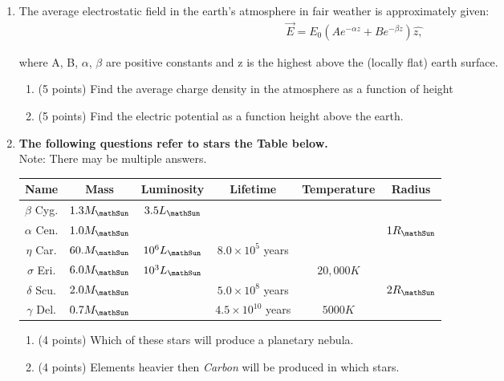 \documentclass[12pt]{article}
\begin{document}
\begin{enumerate}
\color{black}
\item The average electrostatic field in the earth's atmosphere in fair weather is approximately given:
\begin{align}
    \vec{E} = E_0 (Ae^{-\alpha z} + Be^{-\beta z})\hat{z,}
\end{align}
 

where A, B, $\alpha$, $\beta$ are positive constants and z is the highest above the (locally flat) earth surface. 
\begin{enumerate}
    \item (5 points) Find the average charge density in the atmosphere as a function of height\\
    \item (5 points) Find the electric potential as a function height above the earth.\\
\end{enumerate}    

\item\textbf{The following questions refer to stars the Table below.}\\
Note: There may be multiple answers.

\begin{tabular}{|c|c|c|c|c|c|}
\hline
     Name & Mass & Luminosity & Lifetime & Temperature & Radius \\
\hline
     $\beta$ Cyg. & $1.3 M_\mathSun$& $3.5 L_\mathSun$& & &\\
     \hline
     $\alpha$ Cen. & $1.0 M_\mathSun$ & & & & $1R_\mathSun$\\
     \hline
     $\eta$ Car. & $60. M_\mathSun$ & $10^6 L_\mathSun$ & $8.0\times 10^5$ years & &\\
     \hline
     $\sigma$ Eri. & $6.0 M_\mathSun$ & $10^3 L_\mathSun$& & $20,000K$ &\\
     \hline
     $\delta$ Scu. & $2.0 M_\mathSun$& & $5.0\times10^8$ years & & $2 R_\mathSun$\\
     \hline
     $\gamma$ Del. & $0.7 M_\mathSun$& &$4.5\times10^{10}$ years&$5000K$&\\
     \hline
\end{tabular}

\begin{enumerate}
    \item (4 points) Which of these stars will produce a planetary nebula.\\
    \item (4 points) Elements heavier then \textit{Carbon} will be produced in which stars.
\end{enumerate}    

\end{enumerate} 
\end{document}
